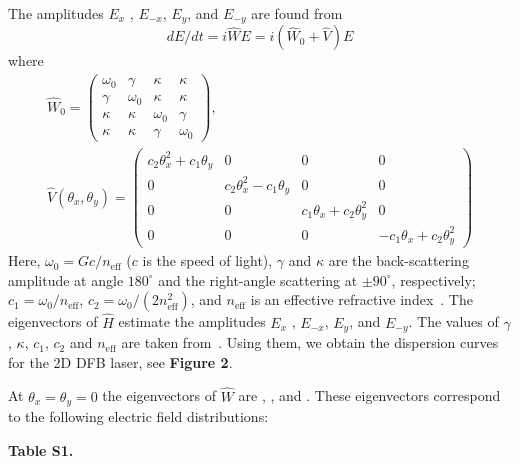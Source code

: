 \documentclass[aps,pra,amsmath,amssymb,onecolumn,superscriptaddress,showpacs,floatfix,]{revtex4-1}
\begin{document}
The amplitudes  ${E_x}$ , ${E_{ - x}}$,  ${E_y}$, and ${E_{ - y}}$ are found from
\begin{equation}
dE/dt = i\hat WE = i\left( {{{\hat W}_0} + \hat V} \right)E\tag{6}
\end{equation}
where 
\begin{equation}
\begin{array}{l}
{\hat W_0} = \left( {\begin{array}{*{20}{c}}
	{{\omega _0}}&\gamma &\kappa &\kappa \\
	\gamma &{{\omega _0}}&\kappa &\kappa \\
	\kappa &\kappa &{{\omega _0}}&\gamma \\
	\kappa &\kappa &\gamma &{{\omega _0}}
	\end{array}} \right) , \\
\hat V\left( {{\theta _x},{\theta _y}} \right) = \left( {\begin{array}{*{20}{c}}
	{{c_2}\theta _x^2 + {c_1}{\theta _y}}&0&0&0\\
	0&{{c_2}\theta _x^2 - {c_1}{\theta _y}}&0&0\\
	0&0&{{c_1}{\theta _x} + {c_2}\theta _y^2}&0\\
	0&0&0&{ - {c_1}{\theta _x} + {c_2}\theta _y^2}
	\end{array}} \right)\tag{7}
\end{array}
\end{equation}
Here, ${\omega _0} = Gc/{n_\text{eff}}$ ($c$ is the speed of light), $\gamma $  and $\kappa$  are the back-scattering amplitude at angle $180^{\circ }$ and the right-angle scattering at $\pm 90^{\circ }$, respectively; ${c_1} = {\omega _0}/{n_\text{eff}}$, ${c_2} = {\omega _0}/\left( {2n_\text{eff}^2} \right)$, and ${n_\text{eff}}$  is an effective refractive index~\cite{ExterOptExp,TennerJOpt}.
The eigenvectors of $\hat H$  estimate the amplitudes ${E_x}$ , ${E_{ - x}}$,  ${E_y}$, and ${E_{ - y}}$.
The values of $\gamma $, $\kappa$, $c_1$, $c_2$ and $n_\text{eff}$ are taken from~\cite{TennerJOpt}.
Using them, we obtain the dispersion curves for the 2D DFB laser, see \textbf{Figure 2}.

At $\theta _x = \theta _y = 0$ the eigenvectors of $\hat W$ are , ,  and . 
These eigenvectors correspond to the following electric field distributions:

\textbf{Table S1.}
\end{document}
